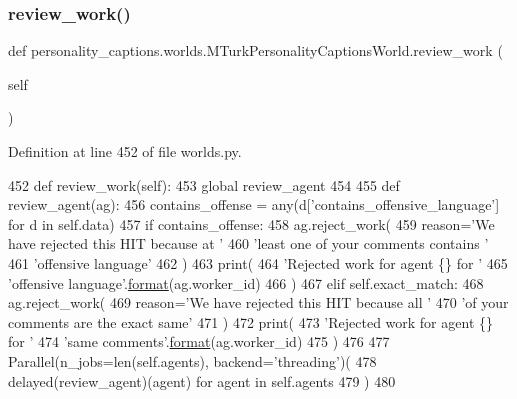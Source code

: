 \subsubsection{\texorpdfstring{review\+\_\+work()}{review\_work()}}
{\footnotesize\ttfamily def personality\+\_\+captions.\+worlds.\+M\+Turk\+Personality\+Captions\+World.\+review\+\_\+work (\begin{DoxyParamCaption}\item[{}]{self }\end{DoxyParamCaption})}



Definition at line 452 of file worlds.\+py.


\begin{DoxyCode}
452     \textcolor{keyword}{def }review\_work(self):
453         \textcolor{keyword}{global} review\_agent
454 
455         \textcolor{keyword}{def }review\_agent(ag):
456             contains\_offense = any(d[\textcolor{stringliteral}{'contains\_offensive\_language'}] \textcolor{keywordflow}{for} d \textcolor{keywordflow}{in} self.data)
457             \textcolor{keywordflow}{if} contains\_offense:
458                 ag.reject\_work(
459                     reason=\textcolor{stringliteral}{'We have rejected this HIT because at '}
460                     \textcolor{stringliteral}{'least one of your comments contains '}
461                     \textcolor{stringliteral}{'offensive language'}
462                 )
463                 print(
464                     \textcolor{stringliteral}{'Rejected work for agent \{\} for '}
465                     \textcolor{stringliteral}{'offensive language'}.\hyperlink{namespaceparlai_1_1chat__service_1_1services_1_1messenger_1_1shared__utils_a32e2e2022b824fbaf80c747160b52a76}{format}(ag.worker\_id)
466                 )
467             \textcolor{keywordflow}{elif} self.exact\_match:
468                 ag.reject\_work(
469                     reason=\textcolor{stringliteral}{'We have rejected this HIT because all '}
470                     \textcolor{stringliteral}{'of your comments are the exact same'}
471                 )
472                 print(
473                     \textcolor{stringliteral}{'Rejected work for agent \{\} for '}
474                     \textcolor{stringliteral}{'same comments'}.\hyperlink{namespaceparlai_1_1chat__service_1_1services_1_1messenger_1_1shared__utils_a32e2e2022b824fbaf80c747160b52a76}{format}(ag.worker\_id)
475                 )
476 
477         Parallel(n\_jobs=len(self.agents), backend=\textcolor{stringliteral}{'threading'})(
478             delayed(review\_agent)(agent) \textcolor{keywordflow}{for} agent \textcolor{keywordflow}{in} self.agents
479         )
480 
\end{DoxyCode}

